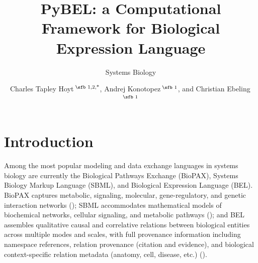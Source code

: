 \documentclass{bioinfo}
\begin{document}

\subtitle{Systems Biology}

\title[PyBEL]{PyBEL: a Computational Framework for Biological Expression Language}
\author[Hoyt \textit{et~al}.]{Charles Tapley Hoyt\,$^{\text{\sfb 1,2,*}}$, Andrej Konotopez\,$^{\text{\sfb 1}}$, and Christian Ebeling\,$^{\text{\sfb 1}}$}
\address{$^{\text{\sf 1}}$Department of Bioinformatics, Fraunhofer Institute for Algorithms and Scientific Computing (SCAI), Sankt Augustin, 53754, Germany \\
$^{\text{\sf 2}}$Bonn-Aachen International Center for IT, Rheinische Friedrich-Wilhelms-Universit{\"a}t Bonn, Bonn, 53113, Germany.}



\maketitle

\section{Introduction}

Among the most popular modeling and data exchange languages in systems biology are currently the Biological Pathways Exchange (BioPAX), Systems Biology Markup Language (SBML), and Biological Expression Language (BEL). BioPAX captures metabolic, signaling, molecular, gene-regulatory, and genetic interaction networks (\citealp{Hucka2013}); SBML accommodates mathematical models of biochemical networks, cellular signaling, and metabolic pathways (\citealp{Demir2010}); and BEL assembles qualitative causal and correlative relations between biological entities across multiple modes and scales, with full provenance information including namespace references, relation provenance (citation and evidence), and biological context-specific relation metadata (anatomy, cell, disease, etc.) (\citealp{Slater2014}).
\end{document}
